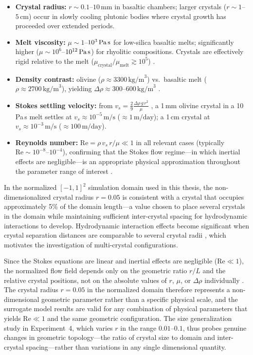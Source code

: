 \begin{itemize}
    \item \textbf{Crystal radius:} $r \sim 0.1$--$10\,\text{mm}$ in basaltic chambers; larger crystals ($r \sim 1$--$5\,\text{cm}$) occur in slowly cooling plutonic bodies where crystal growth has proceeded over extended periods.
    \item \textbf{Melt viscosity:} $\mu \sim 1$--$10^3\,\text{Pa\,s}$ for low-silica basaltic melts; significantly higher ($\mu \sim 10^6$--$10^{12}\,\text{Pa\,s}$) for rhyolitic compositions. Crystals are effectively rigid relative to the melt ($\mu_\text{crystal}/\mu_\text{melt} \gtrsim 10^5$) \parencite{martin_crystal_1988,patocka_settling_2020}.
    \item \textbf{Density contrast:} olivine ($\rho \approx 3300\,\text{kg/m}^3$) vs.\ basaltic melt ($\rho \approx 2700\,\text{kg/m}^3$), yielding $\Delta\rho \approx 300$--$600\,\text{kg/m}^3$ \parencite{martin_crystal_1988}.
    \item \textbf{Stokes settling velocity:} from $v_s = \frac{2}{9}\frac{\Delta\rho\,g\,r^2}{\mu}$ \parencite{happel_low_1983}, a 1\,mm olivine crystal in a 10\,Pa\,s melt settles at $v_s \approx 10^{-5}\,\text{m/s}$ ($\approx 1\,\text{m/day}$); a 1\,cm crystal at $v_s \approx 10^{-3}\,\text{m/s}$ ($\approx 100\,\text{m/day}$).
    \item \textbf{Reynolds number:} $\mathrm{Re} = \rho\,v_s\,r/\mu \ll 1$ in all relevant cases (typically $\mathrm{Re} \sim 10^{-8}$--$10^{-4}$), confirming that the Stokes flow regime—in which inertial effects are negligible—is an appropriate physical approximation throughout the parameter range of interest \parencite{happel_low_1983,martin_crystal_1988}.
\end{itemize}

In the normalized $[-1,1]^2$ simulation domain used in this thesis, the non-dimensionalized crystal radius $r = 0.05$ is consistent with a crystal that occupies approximately 5\% of the domain length—a value chosen to place several crystals in the domain while maintaining sufficient inter-crystal spacing for hydrodynamic interactions to develop. Hydrodynamic interaction effects become significant when crystal separation distances are comparable to several crystal radii \parencite{happel_low_1983}, which motivates the investigation of multi-crystal configurations.

Since the Stokes equations are linear and inertial effects are negligible ($\mathrm{Re} \ll 1$), the normalized flow field depends only on the geometric ratio $r/L$ and the relative crystal positions, not on the absolute values of $r$, $\mu$, or $\Delta\rho$ individually \parencite{happel_low_1983}. The crystal radius $r = 0.05$ in the normalized domain therefore represents a non-dimensional geometric parameter rather than a specific physical scale, and the surrogate model results are valid for any combination of physical parameters that yields $\mathrm{Re} \ll 1$ and the same geometric configuration. The size generalization study in Experiment~4, which varies $r$ in the range $0.01$--$0.1$, thus probes genuine changes in geometric topology—the ratio of crystal size to domain and inter-crystal spacing—rather than variations in any single dimensional quantity.

